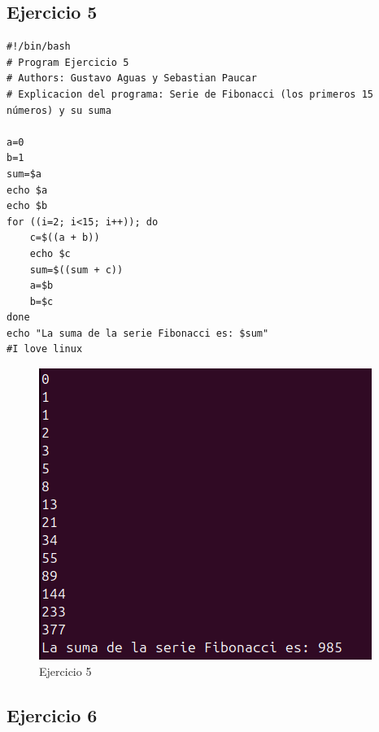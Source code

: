 \documentclass[11pt,twoside]{book}
\begin{document}
\subsection{Ejercicio 5}
\begin{lstlisting}
#!/bin/bash
# Program Ejercicio 5
# Authors: Gustavo Aguas y Sebastian Paucar
# Explicacion del programa: Serie de Fibonacci (los primeros 15 números) y su suma

a=0
b=1
sum=$a
echo $a
echo $b
for ((i=2; i<15; i++)); do
    c=$((a + b))
    echo $c
    sum=$((sum + c))
    a=$b
    b=$c
done
echo "La suma de la serie Fibonacci es: $sum"
#I love linux
\end{lstlisting}
\begin{figure}
    \centering
    \includegraphics[width=0.75\linewidth]{series/ej5.png}
    \caption{Ejercicio 5}
\end{figure}
\newpage
\subsection{Ejercicio 6}
\end{document}
